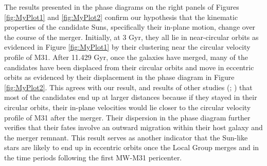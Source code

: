 \documentclass{aastex63}
\begin{document}
The results presented in the phase diagrams on the right panels of Figures \ref{fig:MyPlot1} and \ref{fig:MyPlot2} confirm our hypothesis that the kinematic properties of the candidate Suns, specifically their in-plane motion, change over the course of the merger. Initially, at 3 Gyr, they all lie in near-circular orbits as evidenced in Figure \ref{fig:MyPlot1} by their clustering near the circular velocity profile of M31. After 11.429 Gyr, once the galaxies have merged, many of the candidates have been displaced from their circular orbits and move in eccentric orbits as evidenced by their displacement in the phase diagram in Figure \ref{fig:MyPlot2}. This agrees with our result, and results of other studies (\cite{2012ApJ...753....9V}; \cite{2008MNRAS.386..461C}) that most of the candidates end up at larger distances because if they stayed in their circular orbits, their in-plane velocities would lie closer to the circular velocity profile of M31 after the merger. Their dispersion in the phase diagram further verifies that their fates involve an outward migration within their host galaxy and the merger remnant. This result serves as another indicator that the Sun-like stars are likely to end up in eccentric orbits once the Local Group merges and in the time periods following the first MW-M31 pericenter.


{}

\end{document}
